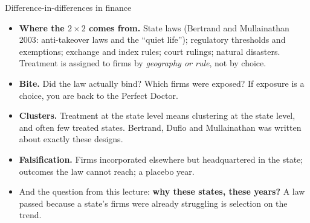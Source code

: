 \documentclass[
  11pt,
  ignorenonframetext,
  aspectratio=169,
]{beamer}
\providecommand{\tightlist}{%
  \setlength{\itemsep}{0pt}\setlength{\parskip}{0pt}}
\begin{document}
\begin{frame}{Difference-in-differences in finance}
\protect{}\label{difference-in-differences-in-finance}
\begin{itemize}
\tightlist
\item
  \textbf{Where the \(2 \times 2\) comes from.} State laws (Bertrand and
  Mullainathan 2003: anti-takeover laws and the ``quiet life'');
  regulatory thresholds and exemptions; exchange and index rules; court
  rulings; natural disasters. Treatment is assigned to firms by
  \emph{geography or rule}, not by choice.
\item
  \textbf{Bite.} Did the law actually bind? Which firms were exposed? If
  exposure is a choice, you are back to the Perfect Doctor.
\item
  \textbf{Clusters.} Treatment at the state level means clustering at
  the state level, and often few treated states. Bertrand, Duflo and
  Mullainathan was written about exactly these designs.
\item
  \textbf{Falsification.} Firms incorporated elsewhere but headquartered
  in the state; outcomes the law cannot reach; a placebo year.
\end{itemize}

\vspace{0.3em}

\begin{itemize}
\tightlist
\item
  And the question from this lecture: \textbf{why these states, these
  years?} A law passed because a state's firms were already struggling
  is selection on the trend.
\end{itemize}
\end{frame}
\end{document}
